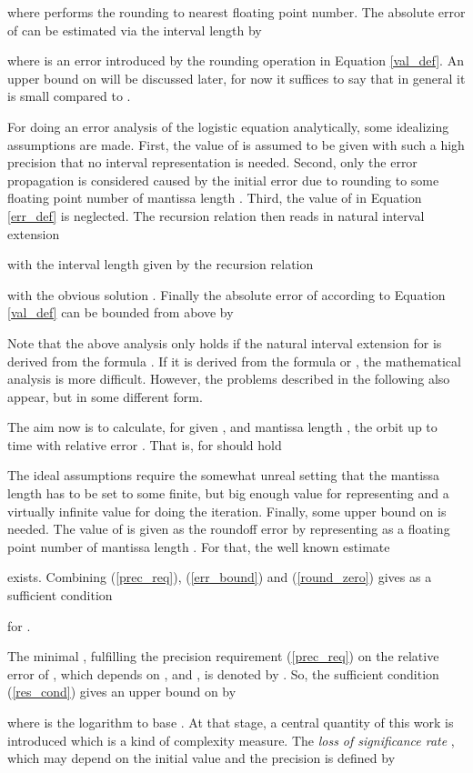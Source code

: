 \documentclass[copyright,creativecommons]{eptcs}
\theoremstyle{definition}
\begin{document}
where  performs the rounding to nearest floating point number.
The absolute error  of  can
be estimated via the interval length  by

where  is an error introduced by the rounding operation  in
Equation \ref{val_def}. An upper bound on  will be discussed later, for
now it suffices to say that in general it is small compared to .

For doing an error analysis of the logistic equation analytically, some
idealizing assumptions are made. First, the value of  is assumed to be
given with such a high precision that no interval representation is needed. Second,
only the error propagation is considered caused by the initial error due to rounding
 to some floating point number of mantissa length . Third, the value
of  in Equation \ref{err_def} is neglected. The recursion relation then reads
in natural interval extension

with the interval length   given by the recursion relation

with the obvious solution . Finally the absolute error 
of  according to Equation \ref{val_def} can be bounded from
above by

Note that the above analysis only holds if the natural interval extension
for  is derived from the formula . If it is derived
from the formula  or
, the mathematical analysis
is more difficult. However, the problems described in the following also
appear, but in some different form.

The aim now is to calculate, for given , 
and mantissa length , the orbit up to time 
with relative error . That is, for
 should hold

The ideal assumptions require the somewhat unreal setting
that the mantissa length has to be set to some finite, but big enough value 
for representing  and a virtually infinite value  for doing the
iteration. Finally, some upper bound on  is needed. The value of 
is given as the roundoff error by representing  as a floating point number
of mantissa length . For that, the well known estimate

exists. Combining (\ref{prec_req}), (\ref{err_bound}) and (\ref{round_zero})
gives as a sufficient condition

for .

The minimal , fulfilling the precision requirement (\ref{prec_req}) on the
relative error of , which depends on ,  and , is
denoted by . So, the sufficient condition (\ref{res_cond})
gives an upper bound on  by

where  is the logarithm to base . At that stage, a central
quantity of this work is introduced which is a kind of complexity measure.
The {\em loss of significance rate} , which may depend on
the initial value  and the precision  is defined by
\end{document}
